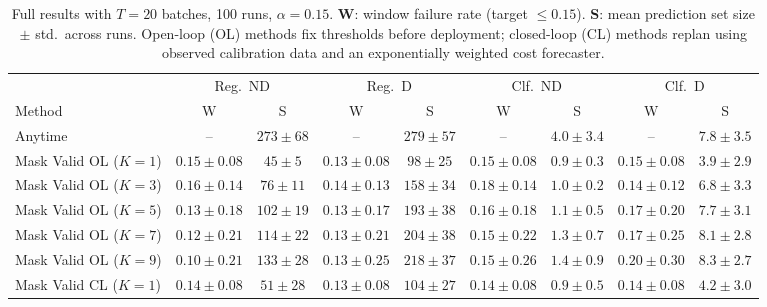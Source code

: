 \documentclass{uai2026} %
\newcommand{\1}{\mathbf{1}}
\begin{document}
\begin{table}[ht]
  \centering
  \caption{%
    Full results with $T = 20$ batches, 100 runs, $\alpha = 0.15$.
    \textbf{W}: window failure rate (target $\le 0.15$).
    \textbf{S}: mean prediction set size $\pm$ std.\ across runs.
    Open-loop (OL) methods fix thresholds before deployment; closed-loop (CL) methods replan using observed calibration data and an exponentially weighted cost forecaster.
  }
  \label{tab:results-full}
  \small
  \begin{tabular}{@{}l|cc|cc|cc|cc@{}}
    \toprule
    & \multicolumn{2}{c|}{Reg.\ ND}
    & \multicolumn{2}{c|}{Reg.\ D}
    & \multicolumn{2}{c|}{Clf.\ ND}
    & \multicolumn{2}{c}{Clf.\ D}                                                                                                                       \\
    \cmidrule(lr){2-3}\cmidrule(lr){4-5}\cmidrule(lr){6-7}\cmidrule(lr){8-9}
    Method                        & W                             & S            & W               & S            & W               & S             & W               & S             \\
    \midrule
    Anytime                       & --                            & $273{\pm}68$ & --              & $279{\pm}57$ & --              & $4.0{\pm}3.4$ & --              & $7.8{\pm}3.5$ \\
    \midrule
    Mask Valid OL ($K{=}1$)  & $0.15{\pm}0.08$               & $45{\pm}5$   & $0.13{\pm}0.08$ & $98{\pm}25$  & $0.15{\pm}0.08$ & $0.9{\pm}0.3$ & $0.15{\pm}0.08$ & $3.9{\pm}2.9$ \\
    Mask Valid OL ($K{=}3$)  & $0.16{\pm}0.14$               & $76{\pm}11$  & $0.14{\pm}0.13$ & $158{\pm}34$ & $0.18{\pm}0.14$ & $1.0{\pm}0.2$ & $0.14{\pm}0.12$ & $6.8{\pm}3.3$ \\
    Mask Valid OL ($K{=}5$)  & $0.13{\pm}0.18$               & $102{\pm}19$ & $0.13{\pm}0.17$ & $193{\pm}38$ & $0.16{\pm}0.18$ & $1.1{\pm}0.5$ & $0.17{\pm}0.20$ & $7.7{\pm}3.1$ \\
    Mask Valid OL ($K{=}7$)  & $0.12{\pm}0.21$               & $114{\pm}22$ & $0.13{\pm}0.21$ & $204{\pm}38$ & $0.15{\pm}0.22$ & $1.3{\pm}0.7$ & $0.17{\pm}0.25$ & $8.1{\pm}2.8$ \\
    Mask Valid OL ($K{=}9$)  & $0.10{\pm}0.21$               & $133{\pm}28$ & $0.13{\pm}0.25$ & $218{\pm}37$ & $0.15{\pm}0.26$ & $1.4{\pm}0.9$ & $0.20{\pm}0.30$ & $8.3{\pm}2.7$ \\
    \midrule
    Mask Valid CL ($K{=}1$)  & $0.14{\pm}0.08$               & $51{\pm}28$  & $0.13{\pm}0.08$ & $104{\pm}27$ & $0.14{\pm}0.08$ & $0.9{\pm}0.5$ & $0.14{\pm}0.08$ & $4.2{\pm}3.0$ \\

\end{tabular}
\end{table}
\end{document}
